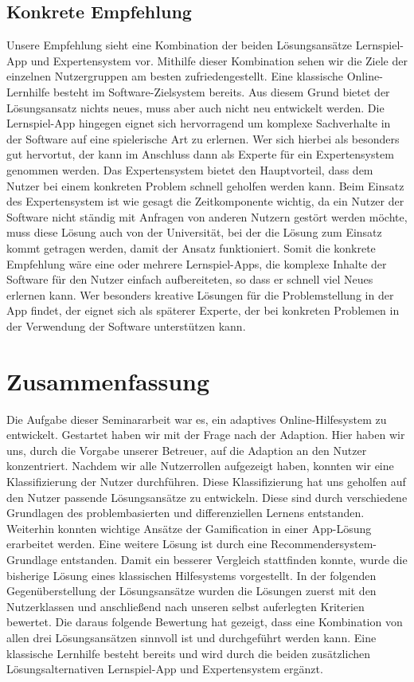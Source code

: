 \section{Konkrete Empfehlung}
Unsere Empfehlung sieht eine Kombination der beiden Lösungsansätze Lernspiel-App und Expertensystem vor. Mithilfe dieser Kombination sehen wir die Ziele der einzelnen Nutzergruppen am besten zufriedengestellt. Eine klassische Online-Lernhilfe besteht im Software-Zielsystem bereits. Aus diesem Grund bietet der Lösungsansatz nichts neues, muss aber auch nicht neu entwickelt werden. Die Lernspiel-App hingegen eignet sich hervorragend um komplexe Sachverhalte in der Software auf eine spielerische Art zu erlernen. Wer sich hierbei als besonders gut hervortut, der kann im Anschluss dann als Experte für ein Expertensystem genommen werden. Das Expertensystem bietet den Hauptvorteil, dass dem Nutzer bei einem konkreten Problem schnell geholfen werden kann. Beim Einsatz des Expertensystem ist wie gesagt die Zeitkomponente wichtig, da ein Nutzer der Software nicht ständig mit Anfragen von anderen Nutzern gestört werden möchte, muss diese Lösung auch von der Universität, bei der die Lösung zum Einsatz kommt getragen werden, damit der Ansatz funktioniert. Somit die konkrete Empfehlung wäre eine oder mehrere Lernspiel-Apps, die komplexe Inhalte der Software für den Nutzer einfach aufbereiteten, so dass er schnell viel Neues erlernen kann. Wer besonders kreative Lösungen für die Problemstellung in der App findet, der eignet sich als späterer Experte, der bei konkreten Problemen in der Verwendung der Software unterstützen kann.

\chapter{Zusammenfassung}
Die Aufgabe dieser Seminararbeit war es, ein adaptives Online-Hilfesystem zu entwickelt. Gestartet haben wir mit der Frage nach der Adaption. Hier haben wir uns, durch die Vorgabe unserer Betreuer, auf die Adaption an den Nutzer konzentriert. Nachdem wir alle Nutzerrollen aufgezeigt haben, konnten wir eine Klassifizierung der Nutzer durchführen. Diese Klassifizierung hat uns geholfen auf den Nutzer passende Lösungsansätze zu entwickeln. Diese sind durch verschiedene Grundlagen des problembasierten und differenziellen Lernens entstanden. Weiterhin konnten wichtige Ansätze der Gamification in einer App-Lösung erarbeitet werden. Eine weitere Lösung ist durch eine Recommendersystem-Grundlage entstanden. Damit ein besserer Vergleich stattfinden konnte, wurde die bisherige Lösung eines klassischen Hilfesystems vorgestellt. In der folgenden Gegenüberstellung der Lösungsansätze wurden die Lösungen zuerst mit den Nutzerklassen und anschließend nach unseren selbst auferlegten Kriterien bewertet. Die daraus folgende Bewertung hat gezeigt, dass eine Kombination von allen drei Lösungsansätzen sinnvoll ist und durchgeführt werden kann. Eine klassische Lernhilfe besteht bereits und wird durch die beiden zusätzlichen Lösungsalternativen Lernspiel-App und Expertensystem ergänzt.

